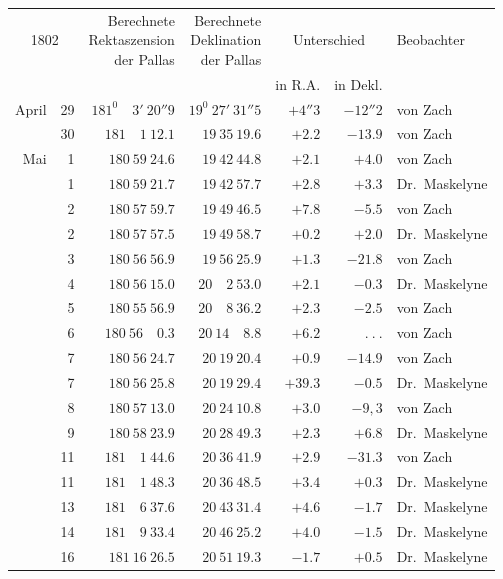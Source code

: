 \begin{center}
{\small\setlength{\tabcolsep}{4pt}
\begin{tabular}{r r|r|r|r|r|l}
\multicolumn{2}{c|}{1802}&\shortstack{Berechnete\\Rektaszension\\der Pallas}&\shortstack{Berechnete\\Deklination\\der Pallas}&\multicolumn{2}{c|}{Unterschied}&Beobachter\\
\multicolumn{2}{c|}{}&&&in R.A.&in Dekl.&\\\hline
April&29&$181^0\quad3'\ 20''9$&$19^0\ 27'\ 31''5$&$+4''3$&$-12''2$&von Zach\\
&30&$181\quad1\ 12.1$&$19\ 35\ 19.6$&$+2.2$&$-13.9$&von Zach\\
Mai&1&$180\ 59\ 24.6$&$19\ 42\ 44.8$&$+2.1$&$+4.0$&von Zach\\
&1&$180\ 59\ 21.7$&$19\ 42\ 57.7$&$+2.8$&$+3.3$&Dr.\ Maskelyne\\
&2&$180\ 57\ 59.7$&$19\ 49\ 46.5$&$+7.8$&$-5.5$&von Zach\\
&2&$180\ 57\ 57.5$&$19\ 49\ 58.7$&$+0.2$&$+2.0$&Dr.\ Maskelyne\\
&3&$180\ 56\ 56.9$&$19\ 56\ 25.9$&$+1.3$&$-21.8$&von Zach\\
&4&$180\ 56\ 15.0$&$20\quad2\ 53.0$&$+2.1$&$-0.3$&Dr.\ Maskelyne\\
&5&$180\ 55\ 56.9$&$20\quad8\ 36.2$&$+2.3$&$-2.5$&von Zach\\
&6&$180\ 56\quad0.3$&$20\ 14\quad8.8$&$+6.2$&$\ .\ .\ .$&von Zach\\
&7&$180\ 56\ 24.7$&$20\ 19\ 20.4$&$+0.9$&$-14.9$&von Zach\\
&7&$180\ 56\ 25.8$&$20\ 19\ 29.4$&$+39.3$&$-0.5$&Dr.\ Maskelyne\\
&8&$180\ 57\ 13.0$&$20\ 24\ 10.8$&$+3.0$&$-9{,}3$&von Zach\\
&9&$180\ 58\ 23.9$&$20\ 28\ 49.3$&$+2.3$&$+6.8$&Dr.\ Maskelyne\\
&11&$181\quad1\ 44.6$&$20\ 36\ 41.9$&$+2.9$&$-31.3$&von Zach\\
&11&$181\quad1\ 48.3$&$20\ 36\ 48.5$&$+3.4$&$+0.3$&Dr.\ Maskelyne\\
&13&$181\quad6\ 37.6$&$20\ 43\ 31.4$&$+4.6$&$-1.7$&Dr.\ Maskelyne\\
&14&$181\quad9\ 33.4$&$20\ 46\ 25.2$&$+4.0$&$-1.5$&Dr.\ Maskelyne\\
&16&$181\ 16\ 26.5$&$20\ 51\ 19.3$&$-1.7$&$+0.5$&Dr.\ Maskelyne
\end{tabular}}
\end{center}

